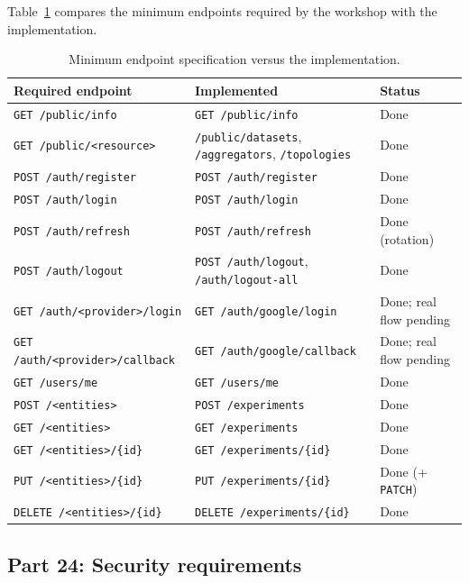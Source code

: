 \documentclass[9pt,a4paper,twocolumn]{article}
\begin{document}
Table~\ref{tab:min-endpoints} compares the minimum endpoints required by the workshop with the implementation.

\begin{table}[H]
\centering
\scriptsize
\begin{tabularx}{\columnwidth}{>{\raggedright\arraybackslash}X >{\raggedright\arraybackslash}X >{\raggedright\arraybackslash}p{}}
\hline
\textbf{Required endpoint} & \textbf{Implemented} & \textbf{Status} \\
\hline
\texttt{GET /public/info} & \texttt{GET /public/info} & Done \\
\texttt{GET /public/<resource>} & \texttt{/public/datasets}, \texttt{/aggregators}, \texttt{/topologies} & Done \\
\texttt{POST /auth/register} & \texttt{POST /auth/register} & Done \\
\texttt{POST /auth/login} & \texttt{POST /auth/login} & Done \\
\texttt{POST /auth/refresh} & \texttt{POST /auth/refresh} & Done (rotation) \\
\texttt{POST /auth/logout} & \texttt{POST /auth/logout}, \texttt{/auth/logout-all} & Done \\
\texttt{GET /auth/<provider>/login} & \texttt{GET /auth/google/login} & Done; real flow pending \\
\texttt{GET /auth/<provider>/callback} & \texttt{GET /auth/google/callback} & Done; real flow pending \\
\texttt{GET /users/me} & \texttt{GET /users/me} & Done \\
\texttt{POST /<entities>} & \texttt{POST /experiments} & Done \\
\texttt{GET /<entities>} & \texttt{GET /experiments} & Done \\
\texttt{GET /<entities>/\{id\}} & \texttt{GET /experiments/\{id\}} & Done \\
\texttt{PUT /<entities>/\{id\}} & \texttt{PUT /experiments/\{id\}} & Done (+ \texttt{PATCH}) \\
\texttt{DELETE /<entities>/\{id\}} & \texttt{DELETE /experiments/\{id\}} & Done \\
\hline
\end{tabularx}
\caption{Minimum endpoint specification versus the implementation.}
\label{tab:min-endpoints}
\end{table}

\subsection{Part 24: Security requirements}
\end{document}
